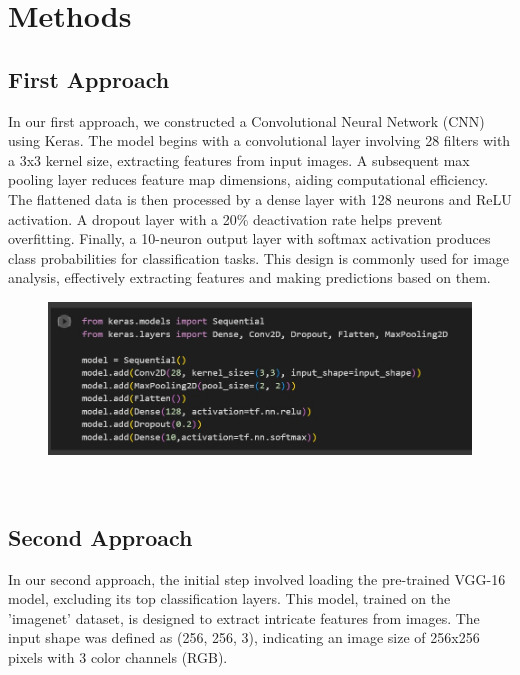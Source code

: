 \documentclass[12pt,a4paper]{article}
\begin{document}
\linebreak

\section{Methods}
\subsection{First Approach}
In our first approach, we constructed a Convolutional Neural Network (CNN) using Keras. The model begins with a convolutional layer involving 28 filters with a 3x3 kernel size, extracting features from input images. A subsequent max pooling layer reduces feature map dimensions, aiding computational efficiency. The flattened data is then processed by a dense layer with 128 neurons and ReLU activation. A dropout layer with a 20\% deactivation rate helps prevent overfitting. Finally, a 10-neuron output layer with softmax activation produces class probabilities for classification tasks. This design is commonly used for image analysis, effectively extracting features and making predictions based on them.

\begin{figure}[h]
    \centering
    \includegraphics[width=\linewidth]{images/2.1 Testing.jpeg}
     
     
     \caption{}     \label{fig:my_label} 
    \end{figure}\\

\subsection{Second Approach}
In our second approach, the initial step involved loading the pre-trained VGG-16 model, excluding its top classification layers. This model, trained on the 'imagenet' dataset, is designed to extract intricate features from images. The input shape was defined as (256, 256, 3), indicating an image size of 256x256 pixels with 3 color channels (RGB).
\end{document}
